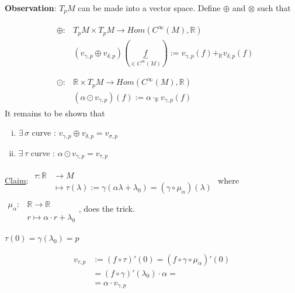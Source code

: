 \textbf{Observation}: $T_pM$ can be made into a vector space. Define $\oplus$ and $\otimes$ such that

\[
\begin{aligned}
& \begin{aligned}
  \oplus : & T_pM \times T_pM \to Hom(C^\infty(M),\mathbb{R})  \\
  & (v_{\gamma,p} \oplus v_{\delta,p})(\underbrace{f}_{ \in C^{\infty}(M)} ) := v_{\gamma,p}(f) +_{\mathbb{R}} v_{\delta,p}(f) \\
  \end{aligned} \\
& \begin{aligned}
    \odot : & \mathbb{R} \times T_pM \to Hom(C^{\infty}(M),\mathbb{R}) \\
    & (\alpha \odot v_{\gamma,p} )(f) := \alpha \cdot_{\mathbb{R}}  v_{\gamma, p}(f)
\end{aligned}
\end{aligned}
\]
It remains to be shown that 
\begin{enumerate}[i)]
  \item $\exists \, \sigma$ curve : $v_{\gamma,p} \oplus v_{\delta,p} = v_{\sigma,p}$
  \item $\exists \, \tau $ curve : $\alpha \odot v_{\gamma,p} = v_{\tau,p}$
\end{enumerate}

\underline{Claim}: $\begin{aligned} & \quad \\ 
  \tau : \mathbb{R} &  \to M  \\
  & \mapsto \tau(\lambda) := \gamma(\alpha  \lambda + \lambda_0) = (\gamma \circ \mu_{\alpha})(\lambda)
\end{aligned}$
where $\begin{aligned} & \quad \\
   \mu_{\alpha}: & \mathbb{R} \to \mathbb{R} \\ 
   & r \mapsto \alpha \cdot r + \lambda_0 \end{aligned}$, 
does the trick.

$\tau(0) = \gamma(\lambda_0) =p$

\[
\begin{aligned}
  v_{\tau,p} & := (f\circ \tau)'(0) = (f\circ \gamma \circ \mu_{\alpha} )'(0) \\ 
  & =  (f\circ \gamma)'(\lambda_0) \cdot \alpha = \\
  & = \alpha \cdot v_{\gamma,p}
\end{aligned}
\]

